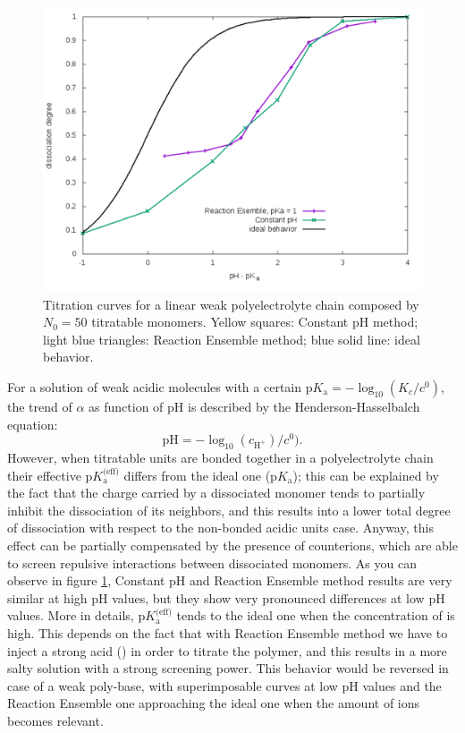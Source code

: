 \documentclass[
a4paper,                        %
11pt,                           %
twoside,                        %
footsepline,                    %
headsepline,                    %
headexclude,                    %
footexclude,                    %
pagesize,                       %
]{scrartcl}
\begin{document}
\begin{figure}[h]
	\centering
	\includegraphics[scale=0.6]{figures/titration.pdf}
	\caption{Titration curves for a linear weak polyelectrolyte chain composed by $N_0=50$ titratable monomers. Yellow squares: Constant pH method; light blue triangles: Reaction Ensemble method; blue solid line: ideal behavior.}
	\label{titration}
\end{figure}
For a solution of weak acidic molecules with a certain $\text{p}K_\text{a}=-\log_{10}(K_c/c^0)$, the trend of $\alpha$ as function of pH is described by the Henderson-Hasselbalch equation:
\begin{equation}
\text{pH} = -\log_{10}(c_{\text{H}^+})/c^0).
\end{equation}
However, when titratable units are bonded together in a polyelectrolyte chain their effective $\text{p}K_\text{a}^\text{(eff)}$ differs from the ideal one ($\text{p}K_\text{a}$); this can be explained by the fact that the charge carried by a dissociated monomer tends to partially inhibit the dissociation of its neighbors, and this results into a lower total degree of dissociation with respect to the non-bonded acidic units case. Anyway, this effect can be partially compensated by the presence of counterions, which are able to  screen repulsive interactions between dissociated monomers. As you can observe in figure \ref{titration}, Constant pH and Reaction Ensemble method results are very similar at high pH values, but they show very pronounced differences at low pH values. More in details, $\text{p}K_\text{a}^\text{(eff)}$ tends to the ideal one when the concentration of  is high. This depends on the fact that with Reaction Ensemble method we have to inject a strong acid () in order to titrate the polymer, and this results in a more salty solution with a strong screening power. This behavior would be reversed in case of a weak poly-base, with superimposable curves at low pH values and the Reaction Ensemble one approaching the ideal one when the amount of  ions becomes relevant.
 
\end{document}
